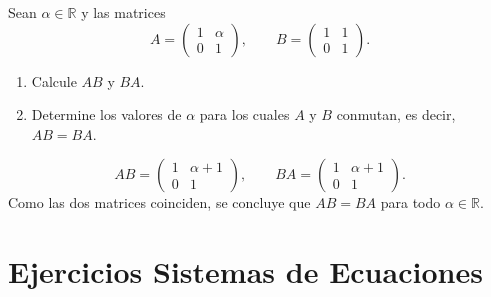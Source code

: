 \documentclass[11pt,respuestas,a4]{aleph-examen}
\begin{document}
\begin{preguntas}
\item
Sean \( \alpha \in \mathbb{R} \) y las matrices
\[
    A=\begin{pmatrix}
        1 & \alpha \\
        0 & 1
    \end{pmatrix},
    \qquad
    B=\begin{pmatrix}
        1 & 1 \\
        0 & 1
    \end{pmatrix}.
\]

\begin{enumerate}
    \item Calcule \( AB \) y \( BA \).
    \item Determine los valores de \( \alpha \) para los cuales \( A \) y \( B \) conmutan, es decir, \( AB=BA \).
\end{enumerate}

\begin{respuesta}
\[
    AB=\begin{pmatrix}
        1 & \alpha+1 \\
        0 & 1
    \end{pmatrix},
    \qquad
    BA=\begin{pmatrix}
        1 & \alpha+1 \\
        0 & 1
    \end{pmatrix}.
\]
Como las dos matrices coinciden, se concluye que \(AB=BA\) para todo \(\alpha\in\mathbb{R}\).
\end{respuesta}

\end{preguntas}

\section*{Ejercicios Sistemas de Ecuaciones}
\end{document}
